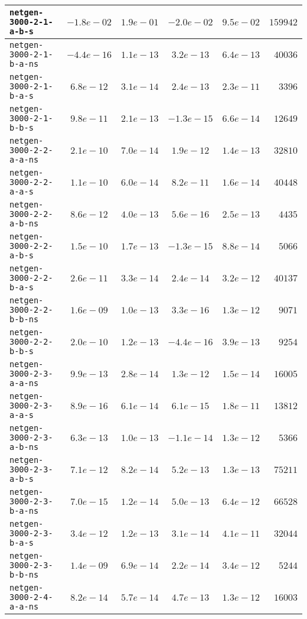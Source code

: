 \begin{center}
\begin{longtable}{|l || c | c | c | c | r|}
\hline
\texttt{netgen-3000-2-1-a-b-s} & $-1.8e-02$ & $1.9e-01$ & $-2.0e-02$ & $9.5e-02$ & $159942$ \\
\hline
\texttt{netgen-3000-2-1-b-a-ns} & $-4.4e-16$ & $1.1e-13$ & $3.2e-13$ & $6.4e-13$ & $40036$ \\
\hline
\texttt{netgen-3000-2-1-b-a-s} & $6.8e-12$ & $3.1e-14$ & $2.4e-13$ & $2.3e-11$ & $3396$ \\
\hline
\texttt{netgen-3000-2-1-b-b-s} & $9.8e-11$ & $2.1e-13$ & $-1.3e-15$ & $6.6e-14$ & $12649$ \\
\hline
\texttt{netgen-3000-2-2-a-a-ns} & $2.1e-10$ & $7.0e-14$ & $1.9e-12$ & $1.4e-13$ & $32810$ \\
\hline
\texttt{netgen-3000-2-2-a-a-s} & $1.1e-10$ & $6.0e-14$ & $8.2e-11$ & $1.6e-14$ & $40448$ \\
\hline
\texttt{netgen-3000-2-2-a-b-ns} & $8.6e-12$ & $4.0e-13$ & $5.6e-16$ & $2.5e-13$ & $4435$ \\
\hline
\texttt{netgen-3000-2-2-a-b-s} & $1.5e-10$ & $1.7e-13$ & $-1.3e-15$ & $8.8e-14$ & $5066$ \\
\hline
\texttt{netgen-3000-2-2-b-a-s} & $2.6e-11$ & $3.3e-14$ & $2.4e-14$ & $3.2e-12$ & $40137$ \\
\hline
\texttt{netgen-3000-2-2-b-b-ns} & $1.6e-09$ & $1.0e-13$ & $3.3e-16$ & $1.3e-12$ & $9071$ \\
\hline
\texttt{netgen-3000-2-2-b-b-s} & $2.0e-10$ & $1.2e-13$ & $-4.4e-16$ & $3.9e-13$ & $9254$ \\
\hline
\texttt{netgen-3000-2-3-a-a-ns} & $9.9e-13$ & $2.8e-14$ & $1.3e-12$ & $1.5e-14$ & $16005$ \\
\hline
\texttt{netgen-3000-2-3-a-a-s} & $8.9e-16$ & $6.1e-14$ & $6.1e-15$ & $1.8e-11$ & $13812$ \\
\hline
\texttt{netgen-3000-2-3-a-b-ns} & $6.3e-13$ & $1.0e-13$ & $-1.1e-14$ & $1.3e-12$ & $5366$ \\
\hline
\texttt{netgen-3000-2-3-a-b-s} & $7.1e-12$ & $8.2e-14$ & $5.2e-13$ & $1.3e-13$ & $75211$ \\
\hline
\texttt{netgen-3000-2-3-b-a-ns} & $7.0e-15$ & $1.2e-14$ & $5.0e-13$ & $6.4e-12$ & $66528$ \\
\hline
\texttt{netgen-3000-2-3-b-a-s} & $3.4e-12$ & $1.2e-13$ & $3.1e-14$ & $4.1e-11$ & $32044$ \\
\hline
\texttt{netgen-3000-2-3-b-b-ns} & $1.4e-09$ & $6.9e-14$ & $2.2e-14$ & $3.4e-12$ & $5244$ \\
\hline
\texttt{netgen-3000-2-4-a-a-ns} & $8.2e-14$ & $5.7e-14$ & $4.7e-13$ & $1.3e-12$ & $16003$ \\

\end{longtable}
\end{center}
